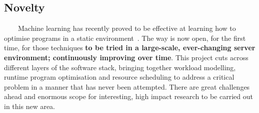 \subsection{Novelty}
~~~~Machine learning has recently proved to be effective at learning how to optimise programs in a static environment~\cite{wangf,wangs}. The way is now open, for the first time, for those techniques \textbf{to be tried in a large-scale, ever-changing server environment; continuously improving over time}. This project cuts across different layers of the software stack, bringing together workload modelling, runtime program optimisation and resource scheduling to address a critical problem in a manner that has never been attempted. There are great challenges ahead and enormous scope for interesting, high impact research to be carried out in this new area.

